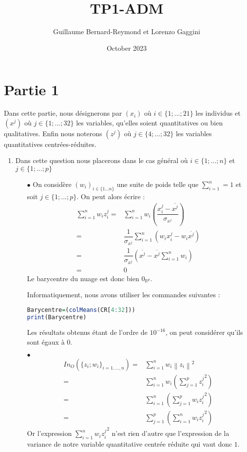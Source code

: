 \documentclass{article}
\title{TP1-ADM}
\author{Guillaume Bernard-Reymond et Lorenzo Gaggini}
\date{October 2023}
\begin{document}
\newcommand{\norme}[1]{\left\| #1\right\|}

\maketitle

\section{Partie 1}
Dans cette partie, nous désignerons par $(x_{i})$ où $i\in\{1;...;21\}$ les individus et $(x^{j})$ où $j\in\{1;...;32\}$ les variables, qu'elles soient quantitatives ou bien qualitatives. Enfin nous noterons $(z^{j})$ où $j\in\{4;...;32\}$ les variables quantitatives centrées-réduites.  
\begin{enumerate}
    \item Dans cette question nous placerons dans le cas général où $i\in\{1;...;n\}$ et $j\in\{1;...;p\}$
    \begin{itemize}
        \item[$\bullet$] On considère $(w_{i})_{i\in\{1...n\}}$ une suite de poids telle que $\displaystyle\sum_{i=1}^{n}=1$ et soit $j\in\{1;...;p\}$. On peut alors écrire : 
        \begin{align*}
            \sum_{i=1}^{n} w_i z_i^j = & \sum_{i=1}^{n} w_i \left(\dfrac{x_i^j-\overline{x^j}}{\sigma_{x^j}}\right)\\
            =& \dfrac{1}{\sigma_{x^j}}\sum_{i=1}^{n}\left(w_i x_{i}^j-w_i \overline{x^j}\right) \\
            =&\dfrac{1}{\sigma_{x^j}} \left(\overline{x^j}-\overline{x^j}\sum_{i=1}^{n} w_i\right)\\
            =& 0
        \end{align*}
    Le barycentre du nuage est donc bien $0_{\mathbb{R}^{p}}$.
    
    Informatiquement, nous avons utiliser les commandes suivantes : 
\begin{lstlisting}[language=R]
Barycentre=(colMeans(CR[4:32]))
print(Barycentre)
\end{lstlisting}    
Les résultats obtenus étant de l'ordre de $10^{-16}$, on peut considérer qu'ils sont égaux à $0$.

    \item[$\bullet$] 
    \begin{align*}
       In_{O}\left(\{z_i;w_i\}_{i=1,...,n}\right) = & \sum_{i=1}^{n} w_i \norme{z_{i}}^2 \\
       = & \sum_{i=1}^{n} w_i \left(\sum_{j=1}^p {z_i^j}^2\right)\\
       =& \sum_{i=1}^{n} \left(\sum_{j=1}^p w_i {z_i^j}^2\right) \\
       =& \sum_{j=1}^p \left( \sum_{i=1}^{n}w_i {z_i^j}^2\right)
    \end{align*}
    Or l'expression $\displaystyle \sum_{i=1}^{n}w_i {z_i^j}^2$ n'est rien d'autre que l'expression de la variance de notre variable quantitative centrée réduite qui vaut donc $1$. 


\end{itemize}
\end{enumerate}
\end{document}
